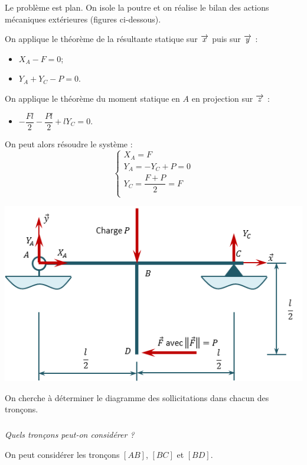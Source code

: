 \documentclass[10pt,fleqn]{article} %
\begin{document}
\begin{multicols}{2}
\begin{corrige}
Le problème est plan. On isole la poutre et on réalise le bilan des actions mécaniques extérieures (figures ci-dessous). 

\begin{minipage}[c]{.47\linewidth}
On applique le théorème de la résultante statique sur $\overrightarrow{x}$ puis sur $\overrightarrow{y}$ :
\begin{itemize}[label=,font=\color{ocre}] 
\item $X_A-F=0$;
\item $Y_A+Y_C-P=0$.
\end{itemize}
On applique le théorème du moment statique en $A$ en projection sur $\overrightarrow{z}$ :
\begin{itemize}[label=,font=\color{ocre}] 
\item $-\dfrac{Fl}{2}-\dfrac{Pl}{2}+lY_C=0$.
\end{itemize}
On peut alors résoudre le système : 
$$
\left\{
\begin{array}{l}
X_A=F \\
Y_A=-Y_C+P = 0 \\
Y_C = \dfrac{F+P}{2} = F\\
\end{array}
\right.
$$
\end{minipage}\hfill
\begin{minipage}[c]{.47\linewidth}
\begin{center}
\includegraphics[width=.95\linewidth]{images/exo_03_corr_01}
\end{center}
\end{minipage}
\end{corrige}
\else 
\fi


On cherche à déterminer le diagramme des sollicitations dans chacun des tronçons.

\subparagraph{}
\textit{Quels tronçons peut-on considérer ?}
\ifprof
\begin{corrige}
On peut considérer les tronçons $[AB]$, $[BC]$ et $[BD]$.
\end{corrige}
\else 
\fi


\end{multicols}
\end{document}
